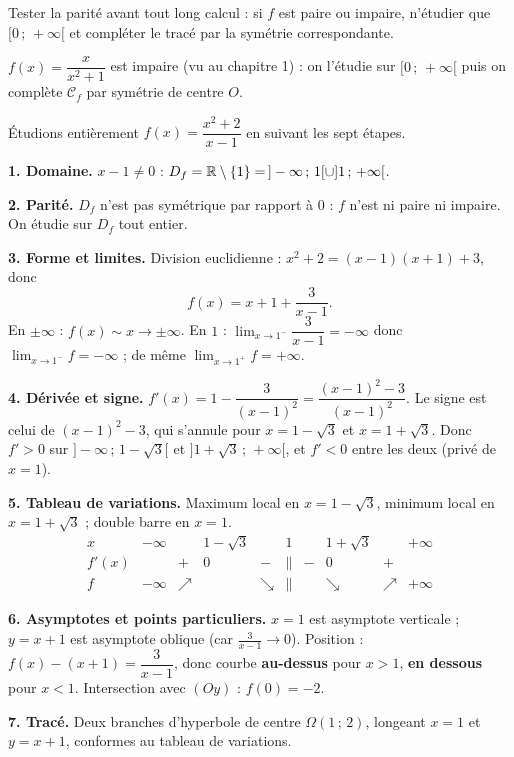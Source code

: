 Tester la parité avant tout long calcul : si $f$ est paire ou impaire, n'étudier que
$[0\,;\,+\infty[$ et compléter le tracé par la symétrie correspondante.
\begin{exemple}
$f(x)=\dfrac{x}{x^2+1}$ est impaire (vu au chapitre 1) : on l'étudie sur $[0\,;\,+\infty[$
puis on complète $\mathcal{C}_f$ par symétrie de centre $O$.
\end{exemple}

Étudions entièrement $f(x)=\dfrac{x^2+2}{x-1}$ en suivant les sept étapes.
\begin{exemple}
\textbf{1. Domaine.} $x-1\neq0$ : $D_f=\mathbb{R}\setminus\{1\}=\,]-\infty\,;\,1[\cup]1\,;\,+\infty[$.

\textbf{2. Parité.} $D_f$ n'est pas symétrique par rapport à $0$ : $f$ n'est ni paire ni
impaire. On étudie sur $D_f$ tout entier.

\textbf{3. Forme et limites.} Division euclidienne : $x^2+2=(x-1)(x+1)+3$, donc
\[ f(x)=x+1+\frac{3}{x-1}. \]
En $\pm\infty$ : $f(x)\sim x\to\pm\infty$. En $1$ : $\lim_{x\to1^-}\dfrac{3}{x-1}=-\infty$
donc $\lim_{x\to1^-}f=-\infty$ ; de même $\lim_{x\to1^+}f=+\infty$.

\textbf{4. Dérivée et signe.} $f'(x)=1-\dfrac{3}{(x-1)^2}=\dfrac{(x-1)^2-3}{(x-1)^2}$. Le
signe est celui de $(x-1)^2-3$, qui s'annule pour $x=1-\sqrt3$ et $x=1+\sqrt3$. Donc
$f'>0$ sur $]-\infty\,;\,1-\sqrt3[$ et $]1+\sqrt3\,;\,+\infty[$, et $f'<0$ entre les deux
(privé de $x=1$).

\textbf{5. Tableau de variations.} Maximum local en $x=1-\sqrt3$, minimum local en
$x=1+\sqrt3$ ; double barre en $x=1$.
\[
\begin{array}{c|ccccccccc}
x     & -\infty & & 1-\sqrt3 & & 1 & & 1+\sqrt3 & & +\infty \\ \hline
f'(x) & & + & 0 & - & \| & - & 0 & + & \\ \hline
f     & -\infty & \nearrow & & \searrow & \| & & \searrow & \nearrow & +\infty
\end{array}
\]

\textbf{6. Asymptotes et points particuliers.} $x=1$ est asymptote verticale ; $y=x+1$ est
asymptote oblique (car $\frac{3}{x-1}\to0$). Position : $f(x)-(x+1)=\dfrac{3}{x-1}$, donc
courbe \textbf{au-dessus} pour $x>1$, \textbf{en dessous} pour $x<1$. Intersection avec
$(Oy)$ : $f(0)=-2$.

\textbf{7. Tracé.} Deux branches d'hyperbole de centre $\Omega(1\,;\,2)$, longeant $x=1$ et
$y=x+1$, conformes au tableau de variations.
\end{exemple}

